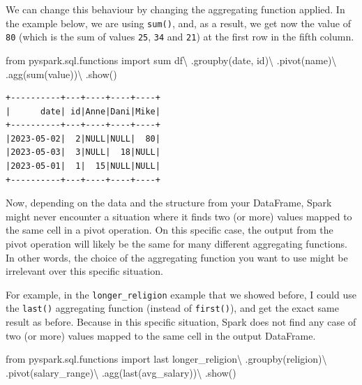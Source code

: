 \documentclass[
  11pt,
  letterpaper,
  DIV=11,
  numbers=noendperiod]{scrreprt}
\newenvironment{Shaded}{\begin{snugshade}}{\end{snugshade}}
\newcommand{\BuiltInTok}[1]{\textcolor[rgb]{0.00,0.23,0.31}{#1}}
\newcommand{\ImportTok}[1]{\textcolor[rgb]{0.00,0.46,0.62}{#1}}
\newcommand{\NormalTok}[1]{\textcolor[rgb]{0.00,0.23,0.31}{#1}}
\newcommand{\OperatorTok}[1]{\textcolor[rgb]{0.37,0.37,0.37}{#1}}
\newcommand{\StringTok}[1]{\textcolor[rgb]{0.13,0.47,0.30}{#1}}
\begin{document}
We can change this behaviour by changing the aggregating function
applied. In the example below, we are using \texttt{sum()}, and, as a
result, we get now the value of \texttt{80} (which is the sum of values
\texttt{25}, \texttt{34} and \texttt{21}) at the first row in the fifth
column.

\begin{Shaded}
\begin{Highlighting}[]
\ImportTok{from}\NormalTok{ pyspark.sql.functions }\ImportTok{import} \BuiltInTok{sum}
\NormalTok{df}\OperatorTok{\textbackslash{}}
\NormalTok{    .groupby(}\StringTok{\textquotesingle{}date\textquotesingle{}}\NormalTok{, }\StringTok{\textquotesingle{}id\textquotesingle{}}\NormalTok{)}\OperatorTok{\textbackslash{}}
\NormalTok{    .pivot(}\StringTok{\textquotesingle{}name\textquotesingle{}}\NormalTok{)}\OperatorTok{\textbackslash{}}
\NormalTok{    .agg(}\BuiltInTok{sum}\NormalTok{(}\StringTok{\textquotesingle{}value\textquotesingle{}}\NormalTok{))}\OperatorTok{\textbackslash{}}
\NormalTok{    .show()}
\end{Highlighting}
\end{Shaded}

\begin{verbatim}
+----------+---+----+----+----+
|      date| id|Anne|Dani|Mike|
+----------+---+----+----+----+
|2023-05-02|  2|NULL|NULL|  80|
|2023-05-03|  3|NULL|  18|NULL|
|2023-05-01|  1|  15|NULL|NULL|
+----------+---+----+----+----+
\end{verbatim}

Now, depending on the data and the structure from your DataFrame, Spark
might never encounter a situation where it finds two (or more) values
mapped to the same cell in a pivot operation. On this specific case, the
output from the pivot operation will likely be the same for many
different aggregating functions. In other words, the choice of the
aggregating function you want to use might be irrelevant over this
specific situation.

For example, in the \texttt{longer\_religion} example that we showed
before, I could use the \texttt{last()} aggregating function (instead of
\texttt{first()}), and get the exact same result as before. Because in
this specific situation, Spark does not find any case of two (or more)
values mapped to the same cell in the output DataFrame.

\begin{Shaded}
\begin{Highlighting}[]
\ImportTok{from}\NormalTok{ pyspark.sql.functions }\ImportTok{import}\NormalTok{ last}
\NormalTok{longer\_religion}\OperatorTok{\textbackslash{}}
\NormalTok{    .groupby(}\StringTok{\textquotesingle{}religion\textquotesingle{}}\NormalTok{)}\OperatorTok{\textbackslash{}}
\NormalTok{    .pivot(}\StringTok{\textquotesingle{}salary\_range\textquotesingle{}}\NormalTok{)}\OperatorTok{\textbackslash{}}
\NormalTok{    .agg(last(}\StringTok{\textquotesingle{}avg\_salary\textquotesingle{}}\NormalTok{))}\OperatorTok{\textbackslash{}}
\NormalTok{    .show()}
\end{Highlighting}
\end{Shaded}
\end{document}
